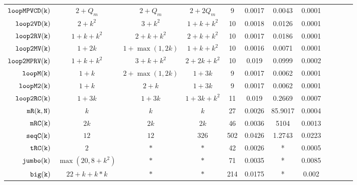 {\begin {table}[H]
\begin{center}
{\begin{tabular}{| >{\tiny}r | c | c | c | c | c | c | c | c | c | c | c }
         $ {\mathtt{loopMPVCD(k)}}$ & $2+Q_m$ &  $2 + Q_m$  & $2+2Q_m$   &   9 & 0.0017 & 0.0043  & 0.0001 \\
         $  \mathtt{loop2VD(k)}$ & $2 + k^2$ &   $3 + k^2$ & $1 + k + k^2 $   &  10 & 0.0018 & 0.0126  & 0.0001  \\
         $  \mathtt{loop2RV(k)}$ & $1 + k +  k^2$ &  
         $ 2 + k +  k^2 $ 
         &  $2 + k + k^2$   &  10 & 0.0017 & 0.0186  & 0.0001  \\
         $  \mathtt{loop2MV(k)}$ & $1 + 2k $ & $1 + \max(1,2k) $ &  $1 + k + k^2 $  & 10 & 0.0016 & 0.0071  & 0.0001 \\
         $ \mathtt{loop2MPRV(k)}$ & $1 + k + k^2$ &  $3 + k + k^2  $ &  $2 + 2k + k^2  $  &  10 & 0.019 & 0.0999  & 0.0002 \\
         {$ \mathtt{loopM(k)}$} & $1 + k$ &  $ 2 + \max(1,2k) $ & $1 + 3k  $  &  9 & 0.0017 & 0.0062  & 0.0001  \\
         {$ \mathtt{loopM2(k)}$} & $1 + k$ &  $ 2 + k $ & $1 + 3k  $  &  9 & 0.0017 & 0.0062  & 0.0001  \\
         {$\mathtt{loop2RC(k)}$} & $1 + 3k$ &  $1 + 3k $ &  $1 + 3k  + k^2$  &  11 & 0.019 & 0.2669  & 0.0007 \\
         $  \mathtt{mR(k, N)}$ & $k$ & $ k   $ & $k $   &  27 & 0.0026 & 85.9017  & 0.0004 \\
         $  \mathtt{mRC(k)}$ & $2k$ & $  2k $ & $ 2k $   &  46 & 0.0036 & 5104  &  0.0013\\
         $  \mathtt{seqC(k)}$ & $12$ & $12  $  & $326 $  &  502 & 0.0426  & 1.2743  & 0.0223 \\
         $  \mathtt{tRC(k)}$ & $2$ &  $ * $ & $*  $  &  42 & 0.0026 & *  & 0.0005\\
         $  \mathtt{{jumbo(k)}}$ & $ \max(20, 8+k^2)$ &  $ * $   &   $* $  &  71 & 0.0035 & * &  0.0085 \\
         $  {\mathtt{big(k)}} $ & $22+k+k*k$ &  $* $ &  $* $  &  214 & 0.0175 & *  & 0.002 \\
         \hline \hline
        \end{tabular}
}
\end{center}
\end{table}
}


